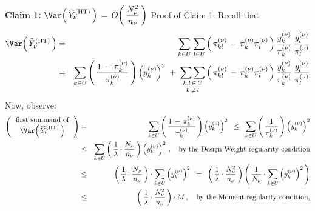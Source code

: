 \vskip 0.5cm
\proof
\vskip 0.1cm
\noindent
\textbf{Claim 1:}\quad
$
\Var\!\left(\,\widehat{Y}^{\textnormal{(HT)}}_{\nu}\,\right)
\,=\,
O\!\left(\,\dfrac{N_{\nu}^{2}}{n_{\nu}}\,\right)
$
\vskip 0.1cm
\noindent
Proof of Claim 1:\;\;
Recall that
\begin{eqnarray*}
\Var\!\left(\,\widehat{Y}^{\textnormal{(HT)}}_{\nu}\,\right)
& = &
    \underset{k \in U}{\sum}\;
    \underset{l \in U}{\sum}
    \left(\,
        \pi^{(\nu)}_{kl}
        \, - \,
        \pi^{(\nu)}_{k}\pi^{(\nu)}_{l}
        \,\right)
    \dfrac{y^{(\nu)}_{k}}{\pi^{(\nu)}_{k}}
    \,
    \dfrac{y^{(\nu)}_{l}}{\pi^{(\nu)}_{l}}
\\
& = &
    \underset{k \in U}{\sum}
    \left(\,
        \dfrac{
            1 \,-\, \pi^{(\nu)}_{k}
            }{
            \pi^{(\nu)}_{k}
            }
        \,\right)
    \left(y^{(\nu)}_{k}\right)^{2}
    \; + \;
    \underset{k\,\neq\,l}{\underset{k,l\,\in\,U}{\sum\sum}}
    \left(\,
        \pi^{(\nu)}_{kl}
        \, - \,
        \pi^{(\nu)}_{k}\pi^{(\nu)}_{l}
        \,\right)
    \dfrac{y^{(\nu)}_{k}}{\pi^{(\nu)}_{k}}
    \,
    \dfrac{y^{(\nu)}_{l}}{\pi^{(\nu)}_{l}}
\end{eqnarray*}
Now, observe:
\begin{eqnarray*}
\left(\,\begin{array}{c}
    \textnormal{first summand of}
    \\
    \Var\!\left(\,\widehat{Y}^{\textnormal{(HT)}}_{\nu}\,\right)
    \end{array}\,\right)
& = &
    \underset{k \in U}{\sum}
    \left(\,
        \dfrac{
            1 \,-\, \pi^{(\nu)}_{k}
            }{
            \pi^{(\nu)}_{k}
            }
        \,\right)
    \left(y^{(\nu)}_{k}\right)^{2}
\;\; \leq \;\;
    \underset{k \in U}{\sum}
    \left(\,
        \dfrac{ 1 }{ \pi^{(\nu)}_{k} }
        \,\right)
    \left(y^{(\nu)}_{k}\right)^{2}
\\
& \leq &
    \underset{k \in U}{\sum}
    \left(\,
        \dfrac{1}{\lambda} \cdot \dfrac{ N_{\nu} }{ n_{\nu} }
        \,\right)
    \left(y^{(\nu)}_{k}\right)^{2}\,,
    \quad
    \textnormal{by the Design Weight regularity condition}
\\
& \leq &
    \left(\,
        \dfrac{1}{\lambda} \cdot \dfrac{ N_{\nu} }{ n_{\nu} }
        \,\right)
    \cdot
    \underset{k \in U}{\sum}
    \left(y^{(\nu)}_{k}\right)^{2}
\;\; = \;\;
    \left(\,
        \dfrac{1}{\lambda} \cdot \dfrac{ N_{\nu}^{2} }{ n_{\nu} }
        \,\right)
    \left(\,
        \dfrac{1}{N_{\nu}}
            \cdot
        \underset{k \in U}{\sum}
        \left(y^{(\nu)}_{k}\right)^{2}
        \,\right)
\\
& \leq &
    \left(\,
        \dfrac{1}{\lambda} \cdot \dfrac{ N_{\nu}^{2} }{ n_{\nu} }
        \,\right)
    \cdot
    M\,,
    \quad
    \textnormal{by the Moment regularity condition},
\end{eqnarray*}
